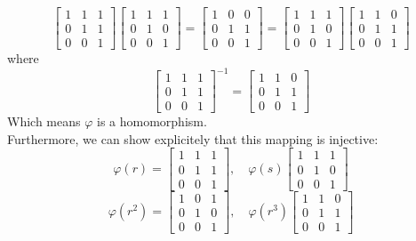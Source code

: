 \documentclass[12pt]{article}
\begin{document}
    \[ \begin{bmatrix} 1 & 1 & 1 \\
        0 & 1 & 1 \\
        0 & 0 & 1 \end{bmatrix}
    \begin{bmatrix} 1 & 1 & 1 \\
        0 & 1 & 0 \\
        0 & 0 & 1 \end{bmatrix}
    = \begin{bmatrix} 1 & 0 & 0 \\
        0 & 1 & 1 \\
        0 & 0 & 1 \end{bmatrix}
    = \begin{bmatrix} 1 & 1 & 1 \\
        0 & 1 & 0 \\
        0 & 0 & 1 \end{bmatrix}
    \begin{bmatrix} 1 & 1 & 0 \\
        0 & 1 & 1 \\
        0 & 0 & 1 \end{bmatrix} \] 
    where
    \[ \begin{bmatrix} 1 & 1 & 1 \\
        0 & 1 & 1 \\
        0 & 0 & 1 \end{bmatrix}^{-1}
    = \begin{bmatrix} 1 & 1 & 0 \\
        0 & 1 & 1 \\
        0 & 0 & 1 \end{bmatrix} \] 
    Which means $\varphi$ is a homomorphism. \\
    Furthermore, we can show explicitely that this mapping is injective:
    \[ \varphi(r) = \begin{bmatrix} 1 & 1 & 1 \\
        0 & 1 & 1 \\
        0 & 0 & 1 \end{bmatrix}, \quad
    \varphi(s) \begin{bmatrix} 1 & 1 & 1 \\
        0 & 1 & 0 \\
        0 & 0 & 1 \end{bmatrix} \]
    \[ \varphi(r^2) = \begin{bmatrix} 1 & 0 & 1 \\
        0 & 1 & 0 \\
        0 & 0 & 1 \end{bmatrix}, \quad
    \varphi(r^3) \begin{bmatrix} 1 & 1 & 0 \\
        0 & 1 & 1 \\
        0 & 0 & 1 \end{bmatrix} \]
\end{document}
